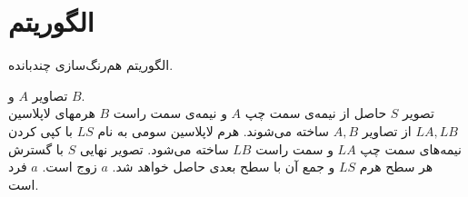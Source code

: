 

\section{الگوریتم}
%

\renewcommand{\algorithmicif}{\textbf{اگر}}
\renewcommand{\algorithmicthen}{\textbf{آنگاه}}
\renewcommand{\algorithmicelse}{\textbf{وگرنه}}
\renewcommand{\algorithmicprint}{\textbf{چاپ کن}}
\begin{algorithm}[!ht]
\caption{الگوریتم هم‌رنگ‌سازی چندبانده.} \label{alg:multibandblending}
\begin{algorithmic}[1]
\REQUIRE تصاویر $A$ و $B$.\\
\ENSURE تصویر $S$ حاصل از  نیمه‌ی سمت چپ $A$ و نیمه‌ی سمت راست $B$
  \STATE هرمهای لاپلاسین $LA,LB$ از تصاویر $A,B$ ساخته می‌شوند.
  \STATE هرم لاپلاسین سومی به نام $LS$ با کپی کردن نیمه‌های سمت چپ $LA$ و سمت راست $LB$ ساخته می‌شود.
  \STATE تصویر نهایی $S$ با گسترش هر سطح هرم $LS$ و جمع آن با سطح بعدی حاصل خواهد شد.   
  \PRINT $a$ زوج است.
  \ELSE 
  \PRINT $a$ فرد است.  
\ENDIF
\end{algorithmic}
\end{algorithm}


